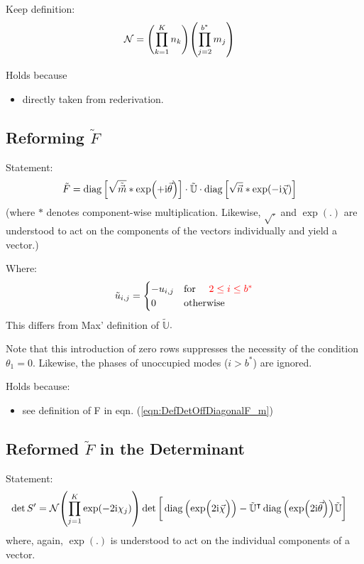 \documentclass[
	english,
	a4paper,
	fontsize=10pt,
	parskip=half,
	titlepage=true,
	DIV=12,
	final
]{scrreprt}
\newcommand*{\transp}{\ensuremath{^\intercal}}
\newcommand*{\iunit}{\ensuremath{\mathrm{i}}}
\DeclareMathOperator{\diag}{diag}
\begin{document}
Keep definition:
\begin{align}
	\mathcal{N}
&=
	\qty( \prod_{k=1}^{K}   n_k )
	\qty( \prod_{j=2}^{b^*} m_j )
\label{eqn:DefN_m}
\end{align}

Holds because
\begin{itemize}
\item directly taken from rederivation.
\end{itemize}

\subsection{Reforming $\tilde{F}$}
Statement:
\begin{align}
	\tilde{F}
&=
	\diag\qty[ \sqrt{ \tilde{\vec{m}}} * \exp(+\iunit \vec{\theta}) ]
	\cdot \tilde{\mathbb{U}} \cdot
	\diag\qty[ \sqrt{        \vec{n} } * \exp(-\iunit \vec{\chi  }) ]
\end{align}
(where $*$ denotes component-wise multiplication. Likewise, $\sqrt{.}$ and $\exp(.)$ are understood to act on the components of the vectors individually and yield a vector.)

Where:
\begin{equation}
	\tilde{u}_{i,j} = \begin{cases}
		-u_{i,j}		&\qq*{for } {\color{red} 2 \leq i \leq b^*} \\
		0			&\qotherwise*
	\end{cases}
\end{equation}
{\color{red} This differs from Max' definition of $\tilde{\mathbb{U}}$}.

Note that this introduction of zero rows suppresses the necessity of the condition $\theta_1 = 0$. Likewise, the phases of unoccupied modes ($i > b^*$) are ignored.

Holds because:
\begin{itemize}
\item see definition of F in eqn. (\ref{eqn:DefDetOffDiagonalF_m})
\end{itemize}

\subsection{Reformed $\tilde{F}$ in the Determinant}
Statement:
\begin{align}
	\det S'
&=
	\mathcal{N}
	\qty( \prod_{j=1}^{K} \exp(-2\iunit \chi_j) )
	\det\qty[\bigg.
		\diag\qty(\exp(\Big.2\iunit\vec{\chi}))
		-
		\tilde{\mathbb{U}}\transp
		\diag\qty(\exp(2\iunit\vec{\theta}))
		\tilde{\mathbb{U}}
	]
\end{align}
where, again, $\exp(.)$ is understood to act on the individual components of a vector.
\end{document}

